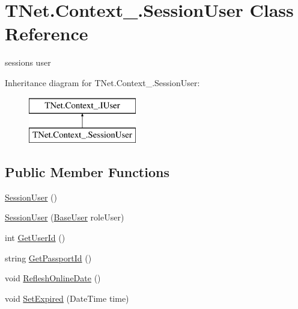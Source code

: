 \hypertarget{class_t_net_1_1_context___1_1_session_user}{}\section{T\+Net.\+Context\+\_\+.\+Session\+User Class Reference}
\label{class_t_net_1_1_context___1_1_session_user}


session\textquotesingle{}s user  


Inheritance diagram for T\+Net.\+Context\+\_\+.\+Session\+User\+:\begin{figure}[H]
\begin{center}
\leavevmode
\includegraphics[height=2.000000cm]{class_t_net_1_1_context___1_1_session_user}
\end{center}
\end{figure}
\subsection*{Public Member Functions}
\begin{DoxyCompactItemize}
\item 
\mbox{\hyperlink{class_t_net_1_1_context___1_1_session_user_a419b0eed9841863e54ef16d8919e0a7c}{Session\+User}} ()
\item 
\mbox{\hyperlink{class_t_net_1_1_context___1_1_session_user_a188f302d923c386b66b167ef49e0ce48}{Session\+User}} (\mbox{\hyperlink{class_t_net_1_1_context___1_1_base_user}{Base\+User}} role\+User)
\item 
int \mbox{\hyperlink{class_t_net_1_1_context___1_1_session_user_a044c8abf77ea4cce65a0cedd4d5efc7c}{Get\+User\+Id}} ()
\item 
string \mbox{\hyperlink{class_t_net_1_1_context___1_1_session_user_a642e0124e4587a2c7d7961da76b13c97}{Get\+Passport\+Id}} ()
\item 
void \mbox{\hyperlink{class_t_net_1_1_context___1_1_session_user_acfe0a90009a42462cb59b8963e703736}{Reflesh\+Online\+Date}} ()
\item 
void \mbox{\hyperlink{class_t_net_1_1_context___1_1_session_user_ad0987cd486a8ff474d73b9d9e40a9bf1}{Set\+Expired}} (Date\+Time time)
\end{DoxyCompactItemize}
